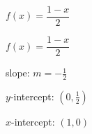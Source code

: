 {$f(x) = \dfrac{1-x}{2}$}
{$f(x) = \dfrac{1-x}{2}$

slope: $m = -\frac{1}{2}$ 

$y$-intercept:  $\left(0, \frac{1}{2}\right)$

$x$-intercept:  $\left(1, 0\right)$


\begin{center}
\end{center}}